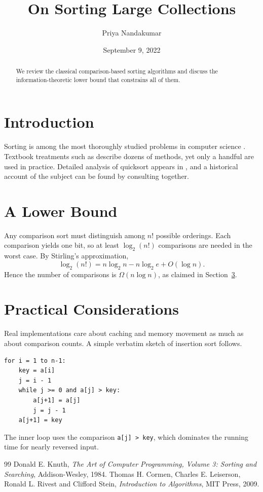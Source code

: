 \documentclass[11pt,a4paper]{article}
\title{On Sorting Large Collections}
\author{Priya Nandakumar}
\date{September 9, 2022}
\begin{document}
\maketitle

\begin{abstract}
We review the classical comparison-based sorting algorithms and discuss the
information-theoretic lower bound that constrains all of them.
\end{abstract}

\section{Introduction}
Sorting is among the most thoroughly studied problems in computer science
\cite{knuth}. Textbook treatments such as \cite{clrs} describe dozens of
methods, yet only a handful are used in practice. Detailed analysis of
quicksort appears in \cite[p.~5]{knuth}, and a historical account of the
subject can be found by consulting \cite{knuth,clrs} together.

\section{A Lower Bound}
Any comparison sort must distinguish among $n!$ possible orderings. Each
comparison yields one bit, so at least $\log_2 (n!)$ comparisons are needed in
the worst case. By Stirling's approximation,
\begin{equation}\label{eq:stirling}
\log_2 (n!) = n\log_2 n - n\log_2 e + O(\log n).
\end{equation}
Hence the number of comparisons is $\Omega(n \log n)$, as claimed in
Section~\ref{sec:practice}.

\section{Practical Considerations}\label{sec:practice}
Real implementations care about caching and memory movement as much as about
comparison counts. A simple verbatim sketch of insertion sort follows.
\begin{verbatim}
for i = 1 to n-1:
    key = a[i]
    j = i - 1
    while j >= 0 and a[j] > key:
        a[j+1] = a[j]
        j = j - 1
    a[j+1] = key
\end{verbatim}
The inner loop uses the comparison \verb|a[j] > key|, which dominates the
running time for nearly reversed input.

\begin{thebibliography}{99}
 Donald E. Knuth, \emph{The Art of Computer
  Programming, Volume 3: Sorting and Searching}, Addison-Wesley, 1984.
 Thomas H. Cormen, Charles E. Leiserson, Ronald L. Rivest and
  Clifford Stein, \emph{Introduction to Algorithms}, MIT Press, 2009.
\end{thebibliography}
\end{document}
